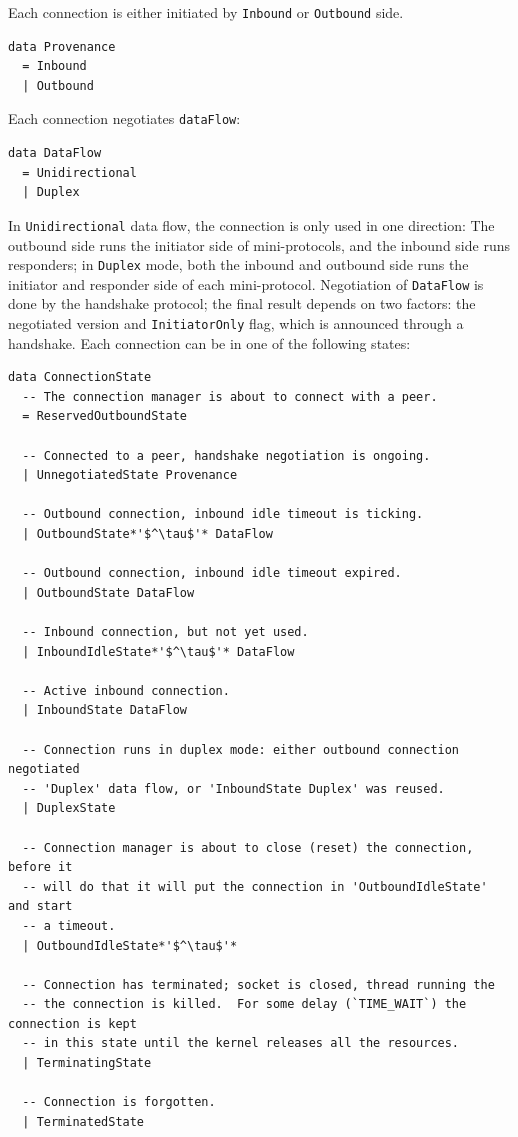 Each connection is either initiated by \texttt{Inbound} or \texttt{Outbound} side.

\begin{lstlisting}
data Provenance
  = Inbound
  | Outbound
\end{lstlisting}
Each connection negotiates \texttt{dataFlow}:
\begin{lstlisting}
data DataFlow
  = Unidirectional
  | Duplex
\end{lstlisting}

In \texttt{Unidirectional} data flow, the connection is only used in one direction:
The outbound side runs the initiator side of mini-protocols, and the inbound side runs
responders; in \texttt{Duplex} mode, both the inbound and outbound side runs
the initiator and responder side of each mini-protocol. Negotiation of
\texttt{DataFlow} is done by the handshake protocol; the final result depends
on two factors: the negotiated version and \texttt{InitiatorOnly} flag, which is
announced through a handshake. Each connection can be in one of the following states:

\begin{lstlisting}
data ConnectionState
  -- The connection manager is about to connect with a peer.
  = ReservedOutboundState

  -- Connected to a peer, handshake negotiation is ongoing.
  | UnnegotiatedState Provenance

  -- Outbound connection, inbound idle timeout is ticking.
  | OutboundState*'$^\tau$'* DataFlow

  -- Outbound connection, inbound idle timeout expired.
  | OutboundState DataFlow

  -- Inbound connection, but not yet used.
  | InboundIdleState*'$^\tau$'* DataFlow

  -- Active inbound connection.
  | InboundState DataFlow

  -- Connection runs in duplex mode: either outbound connection negotiated
  -- 'Duplex' data flow, or 'InboundState Duplex' was reused.
  | DuplexState

  -- Connection manager is about to close (reset) the connection, before it
  -- will do that it will put the connection in 'OutboundIdleState' and start
  -- a timeout.
  | OutboundIdleState*'$^\tau$'*

  -- Connection has terminated; socket is closed, thread running the
  -- the connection is killed.  For some delay (`TIME_WAIT`) the connection is kept
  -- in this state until the kernel releases all the resources.
  | TerminatingState

  -- Connection is forgotten.
  | TerminatedState
\end{lstlisting}

